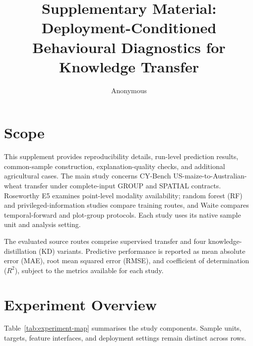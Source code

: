 \documentclass[runningheads]{venue/lncs/llncs}
\title{Supplementary Material: Deployment-Conditioned Behavioural Diagnostics for Knowledge Transfer}
\author{Anonymous}
\institute{Anonymous Institution}
\begin{document}
\maketitle

\section{Scope}

This supplement provides reproducibility details, run-level prediction results, common-sample construction, explanation-quality checks, and additional agricultural cases. The main study concerns CY-Bench US-maize-to-Australian-wheat transfer under complete-input GROUP and SPATIAL contracts. Roseworthy E5 examines point-level modality availability; random forest (RF) and privileged-information studies compare training routes, and Waite compares temporal-forward and plot-group protocols. Each study uses its native sample unit and analysis setting.

The evaluated source routes comprise supervised transfer and four knowledge-distillation (KD) variants. Predictive performance is reported as mean absolute error (MAE), root mean squared error (RMSE), and coefficient of determination ($R^2$), subject to the metrics available for each study.

\section{Experiment Overview}

Table~\ref{tab:experiment-map} summarises the study components. Sample units, targets, feature interfaces, and deployment settings remain distinct across rows.
\end{document}
